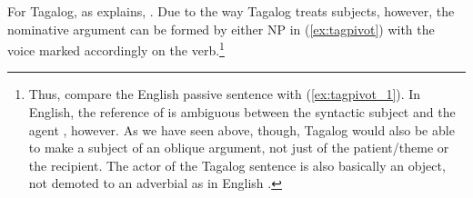 For Tagalog, as \citet{kroeger1991} explains, . Due to the way
Tagalog treats subjects, however, the nominative argument can be formed by
either NP in (\ref{ex:tagpivot}) with the voice marked accordingly on the
verb.\footnote{Thus, compare the English passive sentence  with (\ref{ex:tagpivot_1}). In English,
the reference of  is ambiguous between the syntactic subject 
and the agent , however. As we have seen above, though, Tagalog would
also be able to make a subject of an oblique argument, not just of the
patient/theme or the recipient. The actor of the Tagalog sentence is also
basically an object, not demoted to an adverbial as in English
\citep[38--44]{kroeger1991}.}

